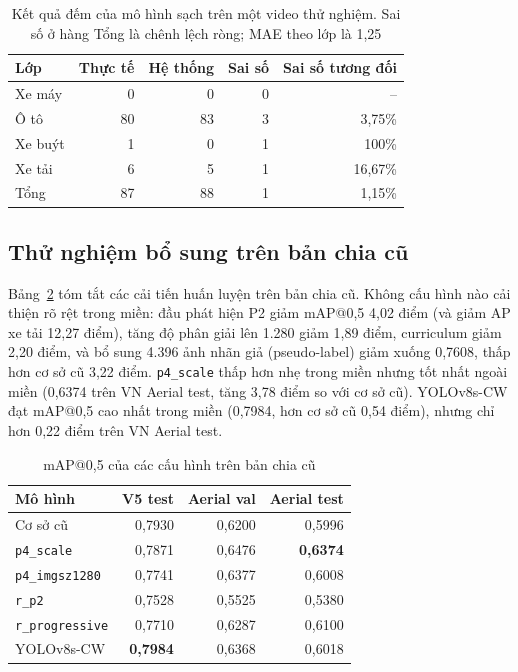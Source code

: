 \documentclass[10pt,journal,letterpaper]{IEEEtran}
\begin{document}
\begin{table}[!t]
\caption{Kết quả đếm của mô hình sạch trên một video thử nghiệm. Sai số ở hàng Tổng là chênh lệch ròng; MAE theo lớp là 1,25}
\label{tab:cnt}
\centering
\footnotesize
\begin{tabular}{lrrrr}
\toprule
Lớp & Thực tế & Hệ thống & Sai số & Sai số tương đối \\
\midrule
Xe máy & 0 & 0 & 0 & -- \\
Ô tô & 80 & 83 & 3 & 3,75\% \\
Xe buýt & 1 & 0 & 1 & 100\% \\
Xe tải & 6 & 5 & 1 & 16,67\% \\
\midrule
Tổng & 87 & 88 & 1 & 1,15\% \\
\bottomrule
\end{tabular}
\end{table}

\subsection{Thử nghiệm bổ sung trên bản chia cũ}
Bảng~\ref{tab:legacy} tóm tắt các cải tiến huấn luyện trên bản chia cũ. Không cấu hình nào cải thiện rõ rệt trong miền: đầu phát hiện P2 giảm mAP@0,5 4,02 điểm (và giảm AP xe tải 12,27 điểm), tăng độ phân giải lên 1.280 giảm 1,89 điểm, curriculum giảm 2,20 điểm, và bổ sung 4.396 ảnh nhãn giả (pseudo-label) giảm xuống 0,7608, thấp hơn cơ sở cũ 3,22 điểm. \texttt{p4\_scale} thấp hơn nhẹ trong miền nhưng tốt nhất ngoài miền (0,6374 trên VN Aerial test, tăng 3,78 điểm so với cơ sở cũ). YOLOv8s-CW đạt mAP@0,5 cao nhất trong miền (0,7984, hơn cơ sở cũ 0,54 điểm), nhưng chỉ hơn 0,22 điểm trên VN Aerial test.

\begin{table}[!t]
\caption{mAP@0,5 của các cấu hình trên bản chia cũ}
\label{tab:legacy}
\centering
\footnotesize
\begin{tabular}{lrrr}
\toprule
Mô hình & V5 test & Aerial val & Aerial test \\
\midrule
Cơ sở cũ & 0,7930 & 0,6200 & 0,5996 \\
\texttt{p4\_scale} & 0,7871 & 0,6476 & \textbf{0,6374} \\
\texttt{p4\_imgsz1280} & 0,7741 & 0,6377 & 0,6008 \\
\texttt{r\_p2} & 0,7528 & 0,5525 & 0,5380 \\
\texttt{r\_progressive} & 0,7710 & 0,6287 & 0,6100 \\
YOLOv8s-CW & \textbf{0,7984} & 0,6368 & 0,6018 \\
\bottomrule
\end{tabular}
\end{table}
\end{document}
